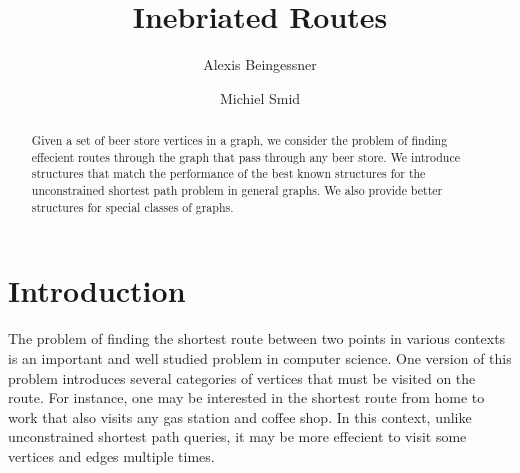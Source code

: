 \documentclass{cccg13}
\begin{document}
\newcommand{\supplier}{beer store}
\newcommand{\supplied}{inebriated}
\newcommand{\Supplier}{Beer store}
\newcommand{\Supplied}{Inebriated}


\newcommand{\suppliers}{\supplier{}s}
\newcommand{\Suppliers}{\Supplier{}s}


\title{\Supplied{} Routes}

\author{
Alexis Beingessner\footnotemark[2]
\and 
Michiel Smid\footnotemark[2]
} 

\thispagestyle{empty}
\maketitle


\begin{abstract}
Given a set of \supplier{} vertices in a graph, we consider the problem of finding effecient routes through the graph that pass through any \supplier{}. We introduce structures that match the performance of the best known structures for the unconstrained shortest path problem in general graphs. We also provide better structures for special classes of graphs.
\end{abstract}







\section{Introduction}   \label{secintro} 
The problem of finding the shortest route between two points in various contexts is an important and well studied problem in computer science. One version of this problem introduces several categories of vertices that must be visited on the route. For instance, one may be interested in the shortest route from home to work that also visits any gas station and coffee shop. In this context, unlike unconstrained shortest path queries, it may be more effecient to visit some vertices and edges multiple times.
\end{document}
